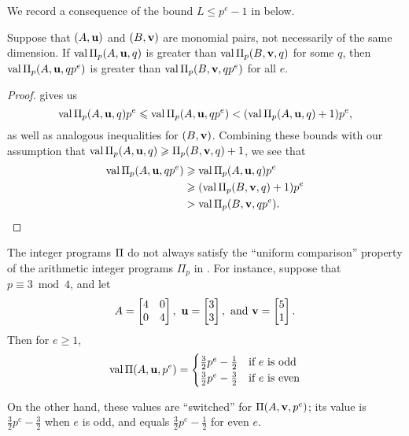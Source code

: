 \documentclass[11pt]{amsart}
\begin{document}
We record a consequence of the bound $L \leq p^e-1$ in  below.

\begin{corollary}
   \label{cor: mu comparison}
   Suppose that $(A,\mathbf{u})$ and $(B,\mathbf{v})$ are monomial pairs, not necessarily of the same dimension.  
   If $\operatorname{val} \Pi_p(A, \mathbf{u}, q)$ is greater than $\operatorname{val} \Pi_p(B, \mathbf{v}, q)$ for some $q$, then $\operatorname{val} \Pi_p(A, \mathbf{u}, qp^e)$ is greater than $\operatorname{val} \Pi_p(B, \mathbf{v}, qp^e)$ for all $e$.
\end{corollary}

\begin{proof}
    gives us
   \begin{equation*}
      \operatorname{val} \Pi_p(A, \mathbf{u},q)p^e \leqslant \operatorname{val} \Pi_p(A, \mathbf{u}, qp^e) < (\operatorname{val} \Pi_p(A, \mathbf{u}, q)+1)p^e,
   \end{equation*}
   as well as analogous inequalities for $(B,\mathbf{v})$.
   Combining these bounds with our assumption that $\operatorname{val} \Pi_p(A, \mathbf{u}, q) \geqslant \Pi_p(B, \mathbf{v}, q) + 1$, we see that
   \begin{align*}
     \operatorname{val} \Pi_p(A, \mathbf{u}, qp^e)  &\geqslant \operatorname{val} \Pi_p(A, \mathbf{u}, q)  p^e \\
                                  &\geqslant (\operatorname{val} \Pi_p(B, \mathbf{v}, q)+1) p^e \\
                                  & > \operatorname{val} \Pi_p(B, \mathbf{v}, qp^e). \qedhere
   \end{align*}
\end{proof}

\begin{remark}
The integer programs $\Pi$ do not always satisfy the ``uniform comparison'' property of the arithmetic integer programs $\Pi_p$ in  .
For instance, suppose that $p \equiv 3 \bmod 4$, and let 
\[
 A = \begin{bmatrix} 4 & 0 \\ 0 & 4\end{bmatrix},  \ 
 \vv{u} = \begin{bmatrix}3\\ 3\end{bmatrix}, \text{ and }
 \vv{v} = \begin{bmatrix}5 \\ 1\end{bmatrix}.
\]
Then for $e \geq 1$, 
\[
\operatorname{val}\Pi(A, \mathbf{u}, p^e) = \begin{cases}  
\frac{3}{2}p^e - \frac{1}{2} & \text{if } e \text{ is odd} \\
\frac{3}{2}p^e - \frac{3}{2} & \text{if } e \text{ is even}
\end{cases}
\]

\noindent On the other hand, these values are ``switched'' for $\Pi(A, \mathbf{v}, p^e)$; its value is $\frac{3}{2}p^e - \frac{3}{2}$ when $e$ is odd, and 
equals $\frac{3}{2}p^e - \frac{1}{2}$ for even $e$. 
\end{remark}
\end{document}
